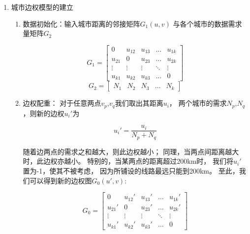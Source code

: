 \documentclass[UTF8,12pt]{ctexart}
\begin{document}
\begin{enumerate}
    \item 城市边权模型的建立
          \begin{enumerate}
              \item 数据初始化：输入城市距离的邻接矩阵$G_1(u,v)$
                    与各个城市的数据需求量矩阵$G_2$
                    \begin{large}
                        $$G_1 = \begin{bmatrix}
                                0      & u_{12} & u_{13} & \ldots & u_{1k} \\
                                u_{21} & 0      & u_{23} & \ldots & u_{2k} \\
                                \vdots & \vdots & \vdots & \ddots & \vdots \\
                                u_{k1} & u_{k2} & u_{k3} & \ldots & 0
                            \end{bmatrix}$$
                        $$G_2=\begin{bmatrix} N_1&N_2&N_3 &\ldots &N_k\end{bmatrix}$$
                    \end{large}
              \item 边权配重：
                    对于任意两点$v_p$,$v_q$我们取出其距离$u_i$，
                    两个城市的需求$N_p$,$N_q$，则新的边权$u_{i}'$为
                    \begin{large}
                        $$u_{i}' = \frac {u_i}{N_p+N_q}$$
                    \end{large}
                    随着边两点的需求之和越大，则此边权越小；
                    同理，当两点间距离越大时，此边权亦越小。
                    特别的，当某两点的距离超过200km时，
                    我们将$u_{i}'$置为-1，使其不被考虑，
                    因为所铺设的线路最远只能到200km。
                    至此，我们可以得到新的边权图$G_{0}(u',v)$:
                    \begin{large}
                        $$G_0 = \begin{bmatrix}
                                0       & u_{12}' & u_{13} ' & \ldots & u_{1k}' \\
                                u_{21}' & 0       & u_{23}'  & \ldots & u_{2k}' \\
                                \vdots  & \vdots  & \vdots   & \ddots & \vdots  \\
                                u_{k1}' & u_{k2}' & u_{k3}'  & \ldots & 0
                            \end{bmatrix}$$
                    \end{large}
          \end{enumerate}
\end{enumerate}
\end{document}
